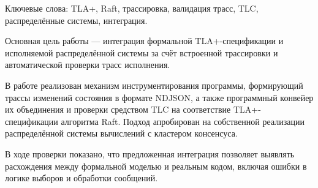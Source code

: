 \abstract %

Ключевые слова: TLA+, Raft, трассировка, валидация трасс, TLC,
распределённые системы, интеграция.

Основная цель работы --- интеграция формальной TLA+-спецификации и
исполняемой распределённой системы за счёт встроенной трассировки и
автоматической проверки трасс исполнения.

В работе реализован механизм инструментирования программы, формирующий
трассы изменений состояния в формате NDJSON, а также программный конвейер
их объединения и проверки средством TLC на соответствие TLA+-спецификации
алгоритма Raft. Подход апробирован на собственной реализации распределённой
системы вычислений с кластером консенсуса.

В ходе проверки показано, что предложенная интеграция позволяет выявлять
расхождения между формальной моделью и реальным кодом, включая ошибки в
логике выборов и обработки сообщений.
